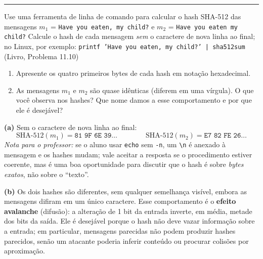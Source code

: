 \documentclass[11pt,a4paper]{article}
\newcommand{\livro}[1]{{\footnotesize\color{black!50}(Livro, Problema #1)}}
\newcommand{\exercicio}[1]{%
    \Needspace{8\baselineskip}%
    \par\vspace{1.2em}
    \noindent
    {\color{black!55}\rule[-0.25em]{3pt}{1.6em}}%
    \hspace{0.6em}{\Large\bfseries Exerc\'{i}cio #1}
    \par\vspace{-0.4em}
    \noindent{\color{black!35}\rule{\textwidth}{0.4pt}}
    \par\vspace{0.35em}
}
\newenvironment{resposta}{%
    \begin{respostabox}
    \color{red!70!black}\sloppy
}{%
    \end{respostabox}
}
\begin{document}
\exercicio{4}
Use uma ferramenta de linha de comando para calcular o hash SHA-512 das mensagens $m_1$ = \texttt{Have you eaten, my child?} e $m_2$ = \texttt{Have you eaten my child?} Calcule o hash de cada mensagem \emph{sem} o caractere de nova linha ao final; no Linux, por exemplo: \texttt{printf 'Have you eaten, my child?' | sha512sum} \livro{11.10}
\begin{enumerate}[label=(\alph*)]
    \item Apresente os quatro primeiros bytes de cada hash em nota\c{c}\~{a}o hexadecimal.
    \item As mensagens $m_1$ e $m_2$ s\~{a}o quase id\^{e}nticas (diferem em uma v\'{i}rgula). O que voc\^{e} observa nos hashes? Que nome damos a esse comportamento e por que ele \'{e} desej\'{a}vel?
\end{enumerate}

\begin{resposta}
\textbf{(a)} Sem o caractere de nova linha ao final:
\[
    \text{SHA-512}(m_1) = \texttt{81 9F 6E 39}\ldots
    \qquad\qquad
    \text{SHA-512}(m_2) = \texttt{E7 82 FE 26}\ldots
\]
\textit{Nota para o professor:} se o aluno usar \texttt{echo} sem \texttt{-n}, um \texttt{\textbackslash n} \'{e} anexado \`{a} mensagem e os hashes mudam; vale aceitar a resposta se o procedimento estiver coerente, mas \'{e} uma boa oportunidade para discutir que o hash \'{e} sobre \emph{bytes exatos}, n\~{a}o sobre o ``texto''.

\textbf{(b)} Os dois hashes s\~{a}o diferentes, sem qualquer semelhan\c{c}a vis\'{i}vel, embora as mensagens difiram em um \'{u}nico caractere. Esse comportamento \'{e} o \textbf{efeito avalanche} (difus\~{a}o): a altera\c{c}\~{a}o de 1 bit da entrada inverte, em m\'{e}dia, metade dos bits da sa\'{i}da. Ele \'{e} desej\'{a}vel porque o hash n\~{a}o deve vazar informa\c{c}\~{a}o sobre a entrada; em particular, mensagens parecidas n\~{a}o podem produzir hashes parecidos, sen\~{a}o um atacante poderia inferir conte\'{u}do ou procurar colis\~{o}es por aproxima\c{c}\~{a}o.
\end{resposta}
\end{document}
